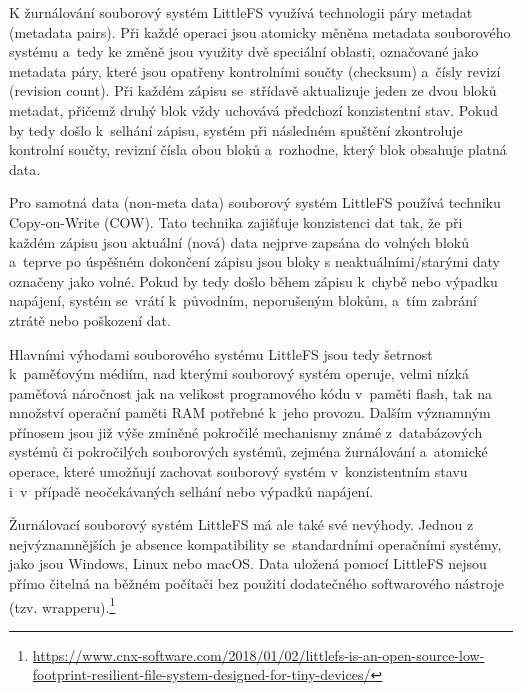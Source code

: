 K žurnálování souborový systém LittleFS využívá technologii páry metadat (metadata pairs). Při každé operaci jsou atomicky měněna metadata souborového systému a~tedy ke změně jsou využity dvě speciální oblasti, označované jako metadata páry, které jsou opatřeny kontrolními součty (checksum) a~čísly revizí (revision count). Při každém zápisu se~střídavě aktualizuje jeden ze dvou bloků metadat, přičemž druhý blok vždy uchovává předchozí konzistentní stav. Pokud by tedy došlo k~selhání zápisu, systém při následném spuštění zkontroluje kontrolní součty, revizní čísla obou bloků a~rozhodne, který blok obsahuje platná data.~\cite{nxp_the_design_of_the_little_filesystem}

Pro samotná data (non-meta data) souborový systém LittleFS používá techniku Copy-on-Write (COW). Tato technika zajišťuje konzistenci dat tak, že při každém zápisu jsou aktuální (nová) data nejprve zapsána do volných bloků a~teprve po úspěšném dokončení zápisu jsou bloky s neaktuálními/starými daty označeny jako volné. Pokud by tedy došlo během zápisu k~chybě nebo výpadku napájení, systém se~vrátí k~původním, neporušeným blokům, a~tím zabrání ztrátě nebo poškození dat.~\cite{nxp_the_design_of_the_little_filesystem}

Hlavními výhodami souborového systému LittleFS jsou tedy šetrnost k~paměťovým médiím, nad kterými souborový systém operuje, velmi nízká paměťová náročnost jak na velikost programového kódu v~paměti flash, tak na množství operační paměti RAM potřebné k~jeho provozu. Dalším významným přínosem jsou již výše zmíněné pokročilé mechanismy známé z~databázových systémů či pokročilých souborových systémů, zejména žurnálování a~atomické operace, které umožňují zachovat souborový systém v~konzistentním stavu i~v~případě neočekávaných selhání nebo výpadků napájení.~\cite{nxp_the_design_of_the_little_filesystem}

Žurnálovací souborový systém LittleFS má ale také své nevýhody. Jednou z nejvýznamnějších je absence kompatibility se~standardními operačními systémy, jako jsou Windows, Linux nebo macOS. Data uložená pomocí LittleFS nejsou přímo čitelná na běžném počítači bez použití dodatečného softwarového nástroje (tzv. wrapperu).\footnote{\url{https://www.cnx-software.com/2018/01/02/littlefs-is-an-open-source-low-footprint-resilient-file-system-designed-for-tiny-devices/}}



